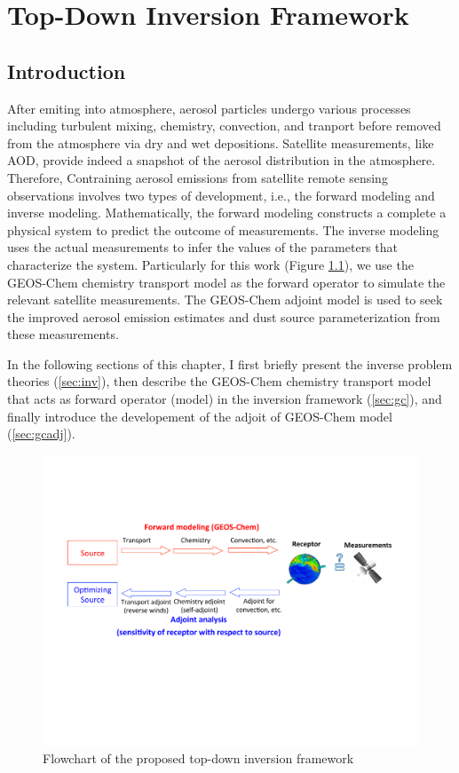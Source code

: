 \chapter{Top-Down Inversion Framework}

 \section{Introduction}
 After emiting into atmosphere, aerosol particles undergo various 
processes including turbulent mixing, chemistry, convection, and tranport
before removed from the atmosphere via dry and wet depositions. Satellite
measurements, like AOD, provide indeed a snapshot of the aerosol distribution
in the atmosphere. Therefore, Contraining aerosol emissions from satellite
remote sensing observations involves two types of development, i.e., the
forward modeling and inverse modeling. Mathematically, the forward modeling
constructs a complete a physical system to predict the outcome of measurements. 
The inverse modeling uses the actual measurements to infer the values of the
parameters that characterize the system. Particularly for this work (Figure
\ref{fig:td_flow}), we use the GEOS-Chem chemistry transport model as the
forward operator to simulate the relevant satellite measurements. The GEOS-Chem
adjoint model is used to seek the improved aerosol emission estimates and dust
source parameterization from these measurements.

In the following sections of this chapter, I first briefly present the
inverse problem theories (\ref{sec:inv}),
then describe the GEOS-Chem chemistry transport model that acts as forward 
operator (model) in the inversion framework (\ref{sec:gc}), and finally
introduce the developement of the adjoit of GEOS-Chem model (\ref{sec:gcadj}).

 \begin{figure}[t]
  \centering
  \includegraphics[width={\textwidth}]{figures/201.pdf}
  \caption{Flowchart of the proposed top-down inversion framework}
  \label{fig:td_flow}
 \end{figure}

